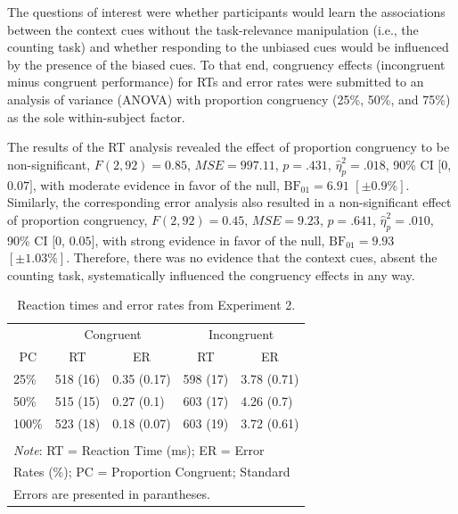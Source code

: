 \documentclass[english,,man,floatsintext]{apa6}
\begin{document}
The questions of interest were whether participants would learn the associations between the context cues without the task-relevance manipulation (i.e., the counting task) and whether responding to the unbiased cues would be influenced by the presence of the biased cues. To that end, congruency effects (incongruent minus congruent performance) for RTs and error rates were submitted to an analysis of variance (ANOVA) with proportion congruency (25\%, 50\%, and 75\%) as the sole within-subject factor.

The results of the RT analysis revealed the effect of proportion congruency to be non-significant, \(F(2, 92) = 0.85\), \(\mathit{MSE} = 997.11\), \(p = .431\), \(\hat{\eta}^2_p = .018\), 90\% CI \([0\), \(0.07]\), with moderate evidence in favor of the null, \(\mathrm{BF}_{\textrm{01}} = 6.91\) \([\pm 0.9\%]\). Similarly, the corresponding error analysis also resulted in a non-significant effect of proportion congruency, \(F(2, 92) = 0.45\), \(\mathit{MSE} = 9.23\), \(p = .641\), \(\hat{\eta}^2_p = .010\), 90\% CI \([0\), \(0.05]\), with strong evidence in favor of the null, \(\mathrm{BF}_{\textrm{01}} = 9.93\) \([\pm 1.03\%]\). Therefore, there was no evidence that the context cues, absent the counting task, systematically influenced the congruency effects in any way.

\begin{table}[htbp]
\centering
\begin{threeparttable}
\caption{Reaction times and error rates from Experiment 2.}
\label{TR_table_2}
\centering
\begin{tabular}{lcccc}
\toprule
& \multicolumn{2}{c}{Congruent} & \multicolumn{2}{c}{Incongruent} \\
\cmidrule(rl){2-3}
\cmidrule(rl){4-5}
\multicolumn{1}{c}{PC} & \multicolumn{1}{c}{RT} & \multicolumn{1}{c}{ER} & \multicolumn{1}{c}{RT} & \multicolumn{1}{c}{ER}  \\
\midrule
\multicolumn{1}{l}{25\%} & \multicolumn{1}{l}{518 (16)} & \multicolumn{1}{l}{0.35 (0.17)} & \multicolumn{1}{l}{598 (17)} & \multicolumn{1}{l}{3.78 (0.71)} \\
\multicolumn{1}{l}{50\%} & \multicolumn{1}{l}{515 (15)} & \multicolumn{1}{l}{0.27 (0.1)} & \multicolumn{1}{l}{603 (17)} & \multicolumn{1}{l}{4.26 (0.7)} \\
\multicolumn{1}{l}{100\%} & \multicolumn{1}{l}{523 (18)} & \multicolumn{1}{l}{0.18 (0.07)} & \multicolumn{1}{l}{603 (19)} & \multicolumn{1}{l}{3.72 (0.61)} \\
& & & & \\
\bottomrule
\multicolumn{5}{l}{\textit{Note}: RT = Reaction Time (ms);  ER = Error} \\
\multicolumn{5}{l}{Rates (\%); PC = Proportion Congruent; Standard} \\
\multicolumn{5}{l}{Errors are presented in parantheses.} \\
\end{tabular}%
\end{threeparttable}
\end{table}
\end{document}
